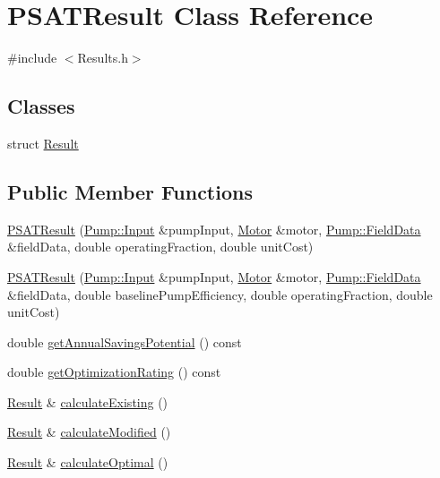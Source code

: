 \hypertarget{class_p_s_a_t_result}{}\section{P\+S\+A\+T\+Result Class Reference}
\label{class_p_s_a_t_result}


{\ttfamily \#include $<$Results.\+h$>$}

\subsection*{Classes}
\begin{DoxyCompactItemize}
\item 
struct \hyperlink{struct_p_s_a_t_result_1_1_result}{Result}
\end{DoxyCompactItemize}
\subsection*{Public Member Functions}
\begin{DoxyCompactItemize}
\item 
\hyperlink{class_p_s_a_t_result_a17778ac130aac171695917a28ffce312}{P\+S\+A\+T\+Result} (\hyperlink{struct_pump_1_1_input}{Pump\+::\+Input} \&pump\+Input, \hyperlink{struct_motor}{Motor} \&motor, \hyperlink{struct_pump_1_1_field_data}{Pump\+::\+Field\+Data} \&field\+Data, double operating\+Fraction, double unit\+Cost)
\item 
\hyperlink{class_p_s_a_t_result_a33c00a85d9c0fd4e8ba444e1a2ccd591}{P\+S\+A\+T\+Result} (\hyperlink{struct_pump_1_1_input}{Pump\+::\+Input} \&pump\+Input, \hyperlink{struct_motor}{Motor} \&motor, \hyperlink{struct_pump_1_1_field_data}{Pump\+::\+Field\+Data} \&field\+Data, double baseline\+Pump\+Efficiency, double operating\+Fraction, double unit\+Cost)
\item 
double \hyperlink{class_p_s_a_t_result_a14fc75c2e0e92f74e3df1b97ed13b496}{get\+Annual\+Savings\+Potential} () const
\item 
double \hyperlink{class_p_s_a_t_result_aa0a7001461408fcb06a6c22ce2d064db}{get\+Optimization\+Rating} () const
\item 
\hyperlink{struct_p_s_a_t_result_1_1_result}{Result} \& \hyperlink{class_p_s_a_t_result_a83e8e621cdd75e6cf2a4d3f6e48bea11}{calculate\+Existing} ()
\item 
\hyperlink{struct_p_s_a_t_result_1_1_result}{Result} \& \hyperlink{class_p_s_a_t_result_a1404ffd1e9420afd3ff4e9284d145646}{calculate\+Modified} ()
\item 
\hyperlink{struct_p_s_a_t_result_1_1_result}{Result} \& \hyperlink{class_p_s_a_t_result_af8ddf3ade8aaca5724201ee177894d1a}{calculate\+Optimal} ()
\end{DoxyCompactItemize}


